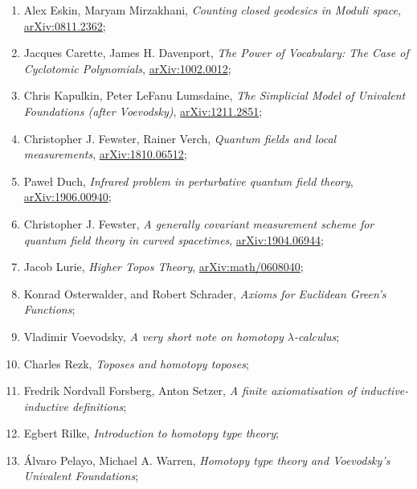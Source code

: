 \documentclass[a4paper,11pt]{article}
\begin{document}
\begin{enumerate}
\item Alex Eskin, Maryam Mirzakhani, \textit{Counting closed geodesics
    in Moduli space},
  \href{https://arxiv.org/abs/0811.2362v3}{arXiv:0811.2362};

\item Jacques Carette, James H. Davenport, \textit{The Power of
    Vocabulary: The Case of Cyclotomic Polynomials},
  \href{https://arxiv.org/abs/1002.0012v1}{arXiv:1002.0012};

\item Chris Kapulkin, Peter LeFanu Lumsdaine, \textit{The Simplicial
    Model of Univalent Foundations (after Voevodsky)},
  \href{https://arxiv.org/abs/1211.2851v5}{arXiv:1211.2851};

\item Christopher J. Fewster, Rainer Verch, \textit{Quantum fields and
    local measurements},
  \href{https://arxiv.org/abs/1810.06512}{arXiv:1810.06512};

\item Paweł Duch, \textit{Infrared problem in perturbative quantum
    field theory},
  \href{https://arxiv.org/abs/1906.00940}{arXiv:1906.00940};

\item Christopher J. Fewster, \textit{A generally covariant
    measurement scheme for quantum field theory in curved spacetimes},
  \href{https://arxiv.org/abs/1904.06944v1}{arXiv:1904.06944};

\item Jacob Lurie, \textit{Higher Topos Theory},
  \href{https://arxiv.org/abs/math/0608040v4}{arXiv:math/0608040};

\item Konrad Osterwalder, and Robert Schrader, \textit{Axioms for
    Euclidean Green's Functions};

\item Vladimir Voevodsky, \textit{A very short note on homotopy
    $\lambda$-calculus};

\item Charles Rezk, \textit{Toposes and homotopy toposes};

\item Fredrik Nordvall Forsberg, Anton Setzer, \textit{A finite
    axiomatisation of inductive-inductive definitions};

\item Egbert Rilke, \textit{Introduction to homotopy type theory};

\item \'{A}lvaro Pelayo, Michael A. Warren, \textit{Homotopy type
    theory and Voevodsky’s Univalent Foundations};


\end{enumerate}
\end{document}
